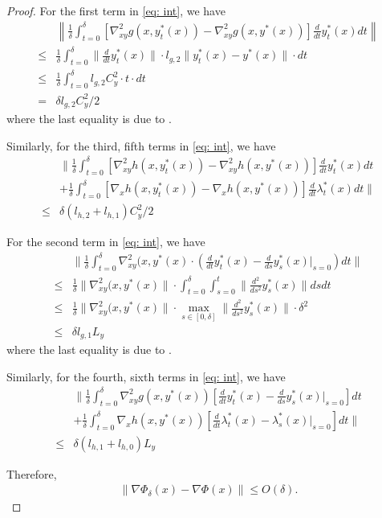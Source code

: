\documentclass{article}
\newcommand{\pth}[1]{\left( #1 \right)}
\newcommand{\qth}[1]{\left[ #1 \right]}
\newcommand{\nth}[1]{\left\| #1 \right\|}
\theoremstyle{plain}
\theoremstyle{definition}
\theoremstyle{remark}
\begin{document}
\begin{proof}
For the first term in \eqref{eq: int}, we have
\begin{align*}
    &\nth{\frac{1}{\delta}\int_{t=0}^\delta [\nabla^2_{xy} g(x, y^*_t(x))-\nabla^2_{xy} g(x, y^*(x))]\frac{d}{d t} y^*_t(x)dt}\\
    \leq&\frac{1}{\delta}\int_{t=0}^\delta \|\frac{d}{d t} y^*_t(x)\|\cdot l_{g,2}\|y_t^*(x)-y^*(x)\|\cdot dt\\
    \leq&\frac{1}{\delta}\int_{t=0}^\delta l_{g,2}C_y^2\cdot t\cdot dt\\
    =&\delta l_{g,2} C_y^2/2
\end{align*}
where the last equality is due to .

Similarly, for the third, fifth terms in \eqref{eq: int}, we have
\begin{align*}
    &\Bigg\|\frac{1}{\delta}\int_{t=0}^\delta \qth{\nabla^2_{xy}h(x,y^*_t(x))-\nabla^2_{xy}h(x,y^*(x))}\frac{d}{d t} y^*_t(x)dt\\
    &+\frac{1}{\delta}\int_{t=0}^\delta \qth{\nabla_x h(x, y^*_t(x))-\nabla_x h(x, y^*(x))}\frac{d}{d t}\lambda^*_t(x)dt\Bigg\|\\
    \leq& \delta (l_{h,2}+l_{h,1}) C_y^2/2
\end{align*}

For the second term in \eqref{eq: int}, we have
\begin{align*}
    &\|\frac{1}{\delta}\int_{t=0}^\delta \nabla^2_{xy} (x, y^*(x)\cdot \pth{\frac{d}{d t} y^*_t(x)-\frac{d}{d s} y^*_s(x)|_{s=0}}dt\| \\
    \leq&\frac{1}{\delta}\|\nabla^2_{xy} (x, y^*(x)\|\cdot\int_{t=0}^{\delta}\int_{s=0}^t\|\frac{d^2}{d s^2}y^*_s(x)\| ds dt\\
    \leq&\frac{1}{\delta}\|\nabla^2_{xy} (x, y^*(x)\|\cdot\max_{s\in[0,\delta]}\|\frac{d^2}{d s^2}y^*_s(x)\|\cdot \delta^2\\
    \leq& \delta l_{g,1}L_y
\end{align*}
where the last equality is due to .

Similarly, for the fourth, sixth terms in \eqref{eq: int}, we have
\begin{align*}
    &\Bigg\|\frac{1}{\delta}\int_{t=0}^\delta\nabla^2_{xy} g(x, y^*(x))\qth{\frac{d}{d t} y^*_t(x)-\frac{d}{d s} y^*_s(x)|_{s=0}}dt \\
    &+ \frac{1}{\delta}\int_{t=0}^\delta\nabla_x h(x, y^*(x))\qth{\frac{d}{d t}\lambda^*_t(x)-\lambda^*_s(x)|_{s=0}}dt\Bigg\|\\
    \leq& \delta (l_{h,1}+l_{h,0})L_y
\end{align*}

Therefore, 
\begin{align*}
    \|\nabla \Phi_\delta(x)-\nabla \Phi(x)\|\leq O(\delta).
\end{align*}
\end{proof}
\end{document}
